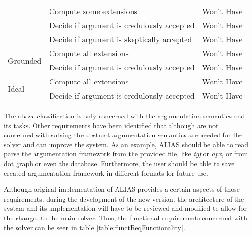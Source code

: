 \begin{table}[]
\begin{tabular}{|l|l|l|}
		& Compute some extensions                          & Won't Have      \\ \cline{2-3} 
		& Decide if argument is credulously accepted & Won't Have      \\ \cline{2-3} 
		& Decide if argument is skeptically accepted & Won't Have      \\ \hline
		\multirow{2}{*}{Grounded}    & Compute all extensions                           & Won't Have      \\ \cline{2-3} 
		& Decide if argument is credulously accepted & Won't Have      \\ \hline
		\multirow{2}{*}{Ideal}       & Compute all extensions                           & Won't Have      \\ \cline{2-3} 
		& Decide if argument is credulously accepted & Won't Have      \\ \hline
	\end{tabular}
\end{table}


The above classification is only concerned with the argumentation semantics and its tasks. Other requirements have been identified that although are not concerned with solving the abstract argumentation semantics are needed for the solver and can improve the system. As an example, ALIAS should be able to read parse the argumentation framework from the provided file, like \textit{tgf} or \textit{apx}, or from dot graph or even the database. Furthermore, the user should be able to save created argumentation framework in different formats for future use. 

Although original implementation of ALIAS provides a certain aspects of those requirements, during the development of the new version, the architecture of the system and its implementation will have to be reviewed and modified to allow for the changes to the main solver. Thus, the functional requirements concerned with the solver can be seen in table \ref{table:functReqFunctionality}.

